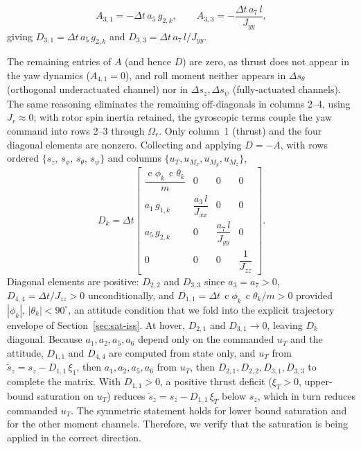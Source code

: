 \documentclass[conf]{new-aiaa}
\DeclareMathOperator{\cs}{c}
\begin{document}
\begin{equation}
\label{eq:sat-A-pitch}
A_{3,1} = -\Delta t\, a_5\, g_{2,k},
\qquad
A_{3,3} = -\frac{\Delta t\, a_7\, l}{J_{yy}},
\end{equation}
giving $D_{3,1} = \Delta t\, a_5\, g_{2,k}$ and $D_{3,3} = \Delta t\, a_7\, l/J_{yy}$.

The remaining entries of $A$ (and hence $D$) are zero, as thrust does not appear in the yaw dynamics ($A_{4,1} = 0$), and roll moment neither appears in $\Delta s_\theta$ (orthogonal underactuated channel) nor in $\Delta s_z, \Delta s_\psi$ (fully-actuated channels). The same reasoning eliminates the remaining off-diagonals in columns 2–4, using $J_r \approx 0$; with rotor spin inertia retained, the gyroscopic terms couple the yaw command into rows 2--3 through $\Omega_r$. Only column~1 (thrust) and the four diagonal elements are nonzero. Collecting and applying $D = -A$, with rows ordered $\{s_z,\, s_\phi,\, s_\theta,\, s_\psi\}$ and columns $\{u_T, u_{M_x}, u_{M_y}, u_{M_z}\}$,
\small
\begin{equation}
\label{eq:sat-D-matrix}
D_k = \Delta t
\begin{bmatrix}
\dfrac{\cs\phi_k\, \cs\theta_k}{m} & 0 & 0 & 0 \\[0.8em]
a_1\, g_{1,k} & \dfrac{a_3\, l}{J_{xx}} & 0 & 0 \\[0.8em]
a_5\, g_{2,k} & 0 & \dfrac{a_7\, l}{J_{yy}} & 0 \\[0.8em]
0 & 0 & 0 & \dfrac{1}{J_{zz}}
\end{bmatrix}.
\end{equation}
\normalsize
Diagonal elements are positive: $D_{2,2}$ and $D_{3,3}$ since $a_3 = a_7 > 0$, $D_{4,4} = \Delta t / J_{zz} > 0$ unconditionally, and $D_{1,1} = \Delta t\, \cs\phi_k\, \cs\theta_k / m > 0$ provided $|\phi_k|,\, |\theta_k| < 90^{\circ}$, an attitude condition that we fold into the explicit trajectory envelope of Section~\ref{sec:sat-iss}. At hover, $D_{2,1}$ and $D_{3,1} \to 0$, leaving $D_k$ diagonal. Because $a_1, a_2, a_5, a_6$ depend only on the commanded $u_T$ and the attitude, $D_{1,1}$ and $D_{4,4}$ are computed from state only, and $u_T$ from $\tilde s_z = s_z - D_{1,1}\,\xi_1$, then $a_1, a_2, a_5, a_6$ from $u_T$, then $D_{2,1}, D_{2,2}, D_{3,1}, D_{3,3}$ to complete the matrix. With $D_{1,1} > 0$, a positive thrust deficit ($\xi_T > 0$, upper-bound saturation on $u_T$) reduces $\tilde s_z = s_z - D_{1,1}\, \xi_T$ below $s_z$, which in turn reduces commanded $u_T$. The symmetric statement holds for lower bound saturation and for the other moment channels. Therefore, we verify that the saturation is being applied in the correct direction. 
\end{document}
